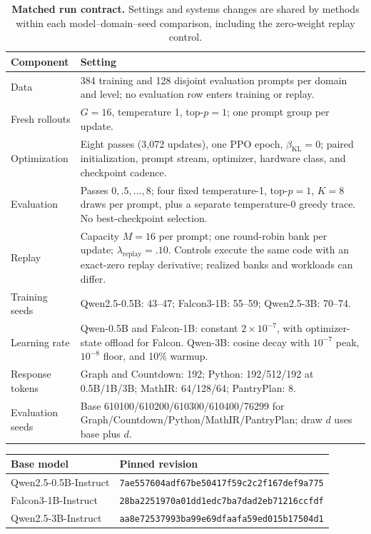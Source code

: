 \begin{table}[H]
  \centering
  \caption{\textbf{Matched run contract.} Settings and systems changes are
  shared by methods within each model--domain--seed comparison, including
  the zero-weight replay control.}
  \label{tab:run-contract}
  \small
  \begin{tabularx}{\linewidth}{@{}P{.23\linewidth}Y@{}}
    \toprule
    \textbf{Component} & \textbf{Setting} \\
    \midrule
    Data & 384 training and 128 disjoint evaluation prompts per domain and
      level; no evaluation row enters training or replay. \\
    Fresh rollouts & $G=16$, temperature 1, top-$p=1$; one prompt group per update. \\
    Optimization & Eight passes (3,072 updates), one PPO epoch,
      $\beta_{\mathrm{KL}}=0$; paired initialization, prompt stream,
      optimizer, hardware class, and checkpoint cadence. \\
    Evaluation & Passes $0,.5,\ldots,8$; four fixed temperature-1,
      top-$p=1$, $K=8$ draws per prompt, plus a separate temperature-0
      greedy trace. No best-checkpoint selection. \\
    Replay & Capacity $M=16$ per prompt; one round-robin bank per update;
      $\lambda_{\mathrm{replay}}=.10$. Controls execute the same code with
      an exact-zero replay derivative; realized banks and workloads can differ. \\
    Training seeds & Qwen2.5-0.5B: 43--47; Falcon3-1B: 55--59;
      Qwen2.5-3B: 70--74. \\
    Learning rate & Qwen-0.5B and Falcon-1B: constant $2\times10^{-7}$,
      with optimizer-state offload for Falcon. Qwen-3B: cosine decay with
      $10^{-7}$ peak, $10^{-8}$ floor, and 10\% warmup. \\
    Response tokens & Graph and Countdown: 192; Python: 192/512/192
      at 0.5B/1B/3B; MathIR: 64/128/64; PantryPlan: 8. \\
    Evaluation seeds & Base 610100/610200/610300/610400/76299 for
      Graph/Countdown/Python/MathIR/PantryPlan; draw $d$ uses base plus $d$. \\
    \bottomrule
  \end{tabularx}
\end{table}

\begin{center}
\small
\begin{tabular}{@{}ll@{}}
\toprule
\textbf{Base model} & \textbf{Pinned revision} \\
\midrule
Qwen2.5-0.5B-Instruct & {\scriptsize\texttt{7ae557604adf67be50417f59c2c2f167def9a775}} \\
Falcon3-1B-Instruct & {\scriptsize\texttt{28ba2251970a01dd1edc7ba7dad2eb71216ccfdf}} \\
Qwen2.5-3B-Instruct & {\scriptsize\texttt{aa8e72537993ba99e69dfaafa59ed015b17504d1}} \\
\bottomrule
\end{tabular}
\end{center}

